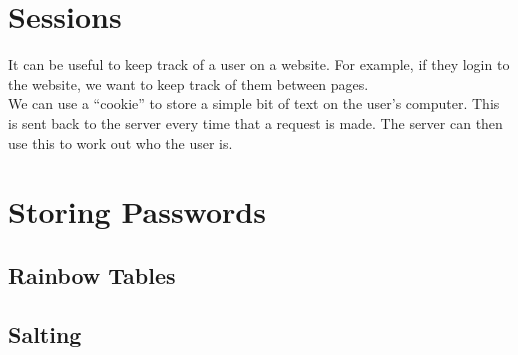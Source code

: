 \section{Sessions}

It can be useful to keep track of a user on a website. For example, if they login to the website, we want to keep track of them between pages.
\\

We can use a ``cookie'' to store a simple bit of text on the user's computer. This is sent back to the server every time that a request is made. The server can then use this to work out who the user is.


\section{Storing Passwords}

\subsection{Rainbow Tables}

\subsection{Salting}
